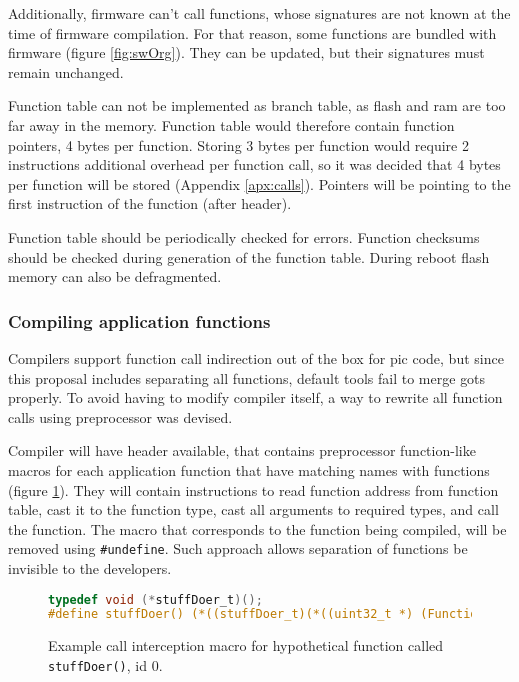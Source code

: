 Additionally, firmware can't call functions, whose signatures are not known at the time of firmware compilation. For that reason, some functions are bundled with firmware (figure \ref{fig:swOrg}). They can be updated, but their signatures must remain unchanged.

Function table can not be implemented as branch table, as flash and ram are too far away in the memory. Function table would therefore contain function pointers, 4 bytes per function. Storing 3 bytes per function would require 2 instructions additional overhead per function call, so it was decided that 4 bytes per function will be stored (Appendix \ref{apx:calls}). Pointers will be pointing to the first instruction of the function (after header).

Function table should be periodically checked for errors. Function checksums should be checked during generation of the function table. During reboot flash memory can also be defragmented.

\subsubsection{Compiling application functions}

Compilers support function call indirection out of the box for \gls{pic} code, but since this proposal includes separating all functions, default tools fail to merge \glspl{got} properly. To avoid having to modify compiler itself, a way to rewrite all function calls using preprocessor was devised.

Compiler will have header available, that contains preprocessor function-like macros for each application function that have matching names with functions (figure \ref{fig:macro}). They will contain instructions to read function address from function table, cast it to the function type, cast all arguments to required types, and call the function. The macro that corresponds to the function being compiled, will be removed using \texttt{\#undefine}. Such approach allows separation of functions be invisible to the developers.

\begin{figure} [htb]
\begin{lstlisting}[language=C]
typedef void (*stuffDoer_t)();
#define stuffDoer() (*((stuffDoer_t)(*((uint32_t *) (FunctionTable + 0)))))()
\end{lstlisting}
\caption{Example call interception macro for hypothetical function called \texttt{stuffDoer()}, id 0.}
\label{fig:macro}
\end{figure}

